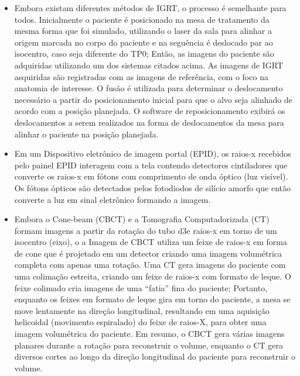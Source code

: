 \documentclass[11pt,a4paper]{article}
\newcounter{exemplo}
\begin{document}
\begin{exemplo}[12. IGRT ]
\begin{itemize}
        \item Embora existam diferentes métodos de IGRT, o processo é semelhante para todos. Inicialmente o paciente é posicionado na mesa de tratamento da mesma forma que foi simulado, utilizando o laser da sala para alinhar a origem marcada no corpo do paciente e na seguência é deslocado par ao isocentro, caso seja diferente do TP0; Então, as imagens do paciente são adquiridas utilizando um dos sistemas citados acima. As imagens de IGRT asquiridas são registradas com as imagens de referência, com o foco na anatomia de interesse. O fusão é utilizada para determinar o deslocamento necessário a partir do posicionamento inicial para que o alvo seja alinhado de acordo com a posição planejada. O software de reposicionamento exibirá os deslocamentos a serem realizados na forma de deslocamentos da mesa para alinhar o paciente na posição planejada.
        
        \item Em um Dispositivo eletrônico de imagem portal (EPID), os raios-x recebidos pelo painel EPID interagem com a tela contendo detectores cintiladores que converte os raios-x em fótons com comprimento de onda óptico (luz visível). Os fótons ópticos são detectados pelos fotodiodos de silício amorfo que então converte a luz em sinal eletrônico formando a imagem.
        
        \item Embora o Cone-beam (CBCT) e a Tomografia Computadorizada (CT) formam imagens a partir da rotação do tubo d3e raios-x em torno de um isocentro (eixo), o a Imagem de CBCT utiliza um feixe de raios-x em forma de cone que é projetado em um detector criando uma imagem volumétrica completa com apenas uma rotação. Uma CT gera imagens do paciente com uma colimação estreita, criando um feixe de raios-x com formato de leque. O feixe colimado cria imagens de uma ``fatia'' fina do paciente; Portanto, enquanto os feixes em formato de leque gira em torno do paciente, a mesa se move lentamente na direção longitudinal, resultando em uma aquisição helicoidal (movimento espiralado) do feixe de raios-X, para obter uma imagem volumétrica do paciente. Em resumo, o CBCT gera várias imagens planares durante a rotação para reconstruir o volume, enquanto o CT gera diversos cortes ao longo da direção longitudinal do paciente para reconstruir o volume.
        

\end{itemize}
\end{exemplo}
\end{document}
